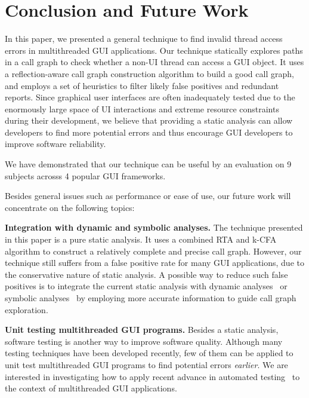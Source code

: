 \section{Conclusion and Future Work}

In this paper, we presented a general technique to find invalid
thread access errors in multithreaded GUI applications. 
Our technique statically explores paths in a call graph to check
whether a non-UI thread can access a GUI object.
It uses a reflection-aware call graph construction algorithm
to build a good call graph, and employs a set of heuristics to
filter likely false positives and redundant reports.
Since graphical user interfaces are often inadequately tested due
to the enormously large space of UI interactions and
extreme resource constraints during their development, we
believe that providing a static analysis can allow developers to find
more potential errors %
and thus encourage GUI developers to improve software reliability.

We have demonstrated that our technique can be useful
by an evaluation on 9 subjects acrosss 4 popular GUI
frameworks. 


Besides general issues such as performance or ease of use, our future
work will concentrate on the following topics:

\textbf{Integration with dynamic and symbolic analyses.} The technique 
presented in this paper is a pure static analysis. It
uses a combined RTA and k-CFA  algorithm to construct a relatively
complete and precise call graph. However, our technique still suffers from
a false positive rate for many GUI applications, due to the conservative
nature of static analysis. A possible way to reduce such false
positives is to integrate the current static analysis with
dynamic analyses~\cite{Jiang:2008:PPS:1453101.1453110}%
or symbolic analyses~\cite{xie05:symstra, Pasareanu:2011, halfond09issta, BMF97}
by employing more accurate information to guide call graph exploration.

\textbf{Unit testing multithreaded GUI programs.} Besides
a static analysis,  software testing is another
way to improve software quality.  Although many
testing techniques have been developed recently, few of them can be applied
to unit test multithreaded GUI programs to find potential errors \textit{earlier}. We
are interested in investigating how to apply recent advance in automated
testing~\cite{Staats:2011:PTO:1985793.1985847, Jagannath:2011:IMU:2025113.2025145, Muccini_Bertolino_Inverardi_2004, Ricca:2001:ATW:381473.381476, Harman:2007}
to the context of multithreaded GUI applications.


